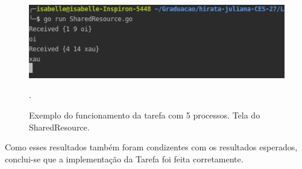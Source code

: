 \documentclass[conference]{IEEEtran}
\begin{document}
\begin{figure}[H]
\centering
\centerline{\includegraphics[scale=0.5]{imagens/ex2-shared.png}}
\caption{Exemplo do funcionamento da tarefa com 5 processos. Tela do SharedResource.}.
\label{ex2-shared}
\end{figure}
	
	Como esses resultados também foram condizentes com os resultados esperados, conclui-se que a implementação da Tarefa foi feita corretamente.
	



\end{document}
